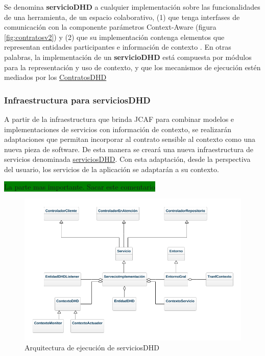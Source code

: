 \begin{itemize}
\begin{defi}[ServiciosDHD:] \label{serviciosDHD}

Se denomina \textbf{servicioDHD} a cualquier implementación sobre las funcionalidades de una herramienta, de un espacio colaborativo, (1) que tenga interfases de comunicación con la componente parámetros Context-Aware (figura \ref{fig:contratosv2}) y  (2) que su implementación contenga elementos que representan entidades participantes e información de contexto \cite{Dey}. En otras palabras, la implementación de un \textbf{servicioDHD} está compuesta por módulos para la representación y uso de contexto, y que los mecanismos de ejecución estén mediados por los \hyperref[contratosdhd]{ContratosDHD} 

\end{defi}

\subsubsection{Infraestructura para serviciosDHD}

A partir de la infraestructura que brinda JCAF para combinar modelos e implementaciones de servicios con información de contexto, se realizarán adaptaciones que permitan incorporar al contrato sensible al contexto como una nueva pieza de software. De esta manera se creará una nueva infraestructura de servicios denominada \hyperref[serviciosDHD]{serviciosDHD}. Con esta adaptación, desde la perspectiva del usuario, los servicios de la aplicación se adaptarán a su contexto. 

\colorbox{green}{La parte mas importante. Sacar este comentario}


\begin{figure}
\begin{center}
\includegraphics[width=5 in,totalheight=3.2 in]{Ch4/serviciosDHD.png}
\caption{Arquitectura de ejecución de serviciosDHD}
\label{fig:serviciosDHD}
\end{center}
\end{figure}



\end{itemize}
